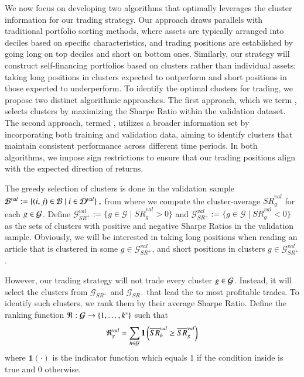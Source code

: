 We now focus on developing two algorithms that optimally leverages the cluster information for our trading strategy. Our approach draws parallels with traditional portfolio sorting methods, where assets are typically arranged into deciles based on specific characteristics, and trading positions are established by going long on top deciles and short on bottom ones. Similarly, our strategy will construct self-financing portfolios based on clusters rather than individual assets: taking long positions in clusters expected to outperform and short positions in those expected to underperform.
%
To identify the optimal clusters for trading, we propose two distinct algorithmic approaches. The first approach, which we term , selects clusters by maximizing the Sharpe Ratio within the validation dataset. The second approach, termed , utilizes a broader information set by incorporating both training and validation data, aiming to identify clusters that maintain consistent performance across different time periods. In both algorithms, we impose sign restrictions to ensure that our trading positions align with the expected direction of returns.


The greedy selection of clusters is done in the validation sample 
$
\mathcal{B}^{val}:= \{
(i,j)\in\mathcal{B} 
 \mid 
  i \in \mathcal{D}^{val} \}
~,
$
from where we compute the cluster-average $\overline{S R}_g^{val}$ for each $g\in\mathcal{G}$.
%
Define $\mathcal G_{SR^+}^{val}:=\{ g\in \mathcal G \mid \overline{SR}_g^{val} >0\}$ and $\mathcal G_{SR^-}^{val}:=\{ g\in \mathcal G \mid \overline{SR}_g^{val} <0\}$ as the sets of clusters with positive and negative Sharpe Ratios in the validation sample. Obviously, we will be interested in taking long positions when reading an article that is clustered in some $g\in \mathcal G_{SR^+}^{val}$, and short positions in clusters $g\in \mathcal G_{SR^+}^{val}$. 

\mx 
However, our trading strategy will not trade every cluster $g\in\mathcal{G}$. Instead, it will select the clusters from $\mathcal G_{SR^+}$ and $\mathcal G_{SR^-}$ that lead the to most profitable trades. 
To identify such clusters, we rank them by their average Sharpe Ratio. Define the ranking function $\mathfrak{R}: \mathcal{G} \to \left\{1, \ldots, k^*\right\}$ such that
$$
\mathfrak{R}_g^{val}
=
\sum_{h \in \mathcal{G}} 
\mathbf{1}\left(
\overline{S R}_h^{val} \geq \overline{S R}_g^{val} 
\right)
$$
where $\mathbf{1}(\cdot)$ is the indicator function which equals 1 if the condition inside is true and 0 otherwise.

